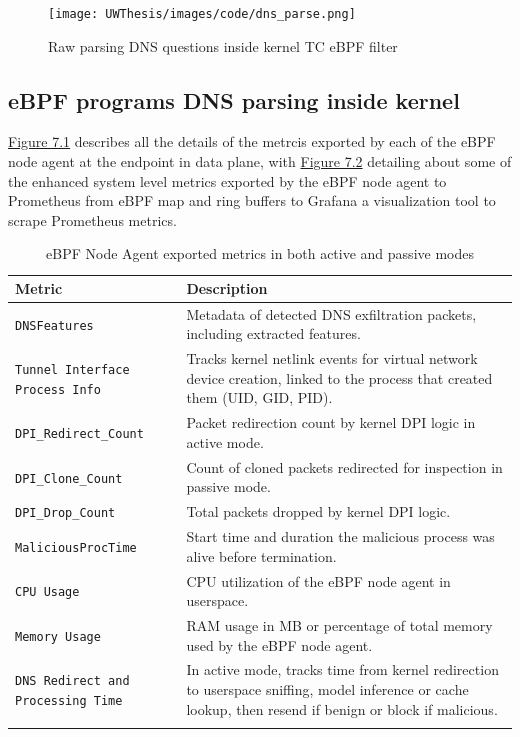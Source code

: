 \documentclass [11pt, proquest] {uwthesis}[2020/02/24]
\begin{document}
\begin{figure}[H]
    \centering
    \texttt{[image: UWThesis/images/code/dns\_parse.png]}
    \caption{Raw parsing DNS questions inside kernel TC eBPF filter}
    \label{fig:c2}
\end{figure}


\subsection{eBPF programs DNS parsing inside kernel}
\hyperref[sec:dp_ebpf_node_metrics]{Figure 7.1} describes all the details of the metrcis exported by each of  the eBPF node agent at the endpoint in data plane, with \hyperref[fig:dns-exfil-packet-metrics]{Figure 7.2} detailing about some of the enhanced system level metrics exported by the eBPF node agent to Prometheus from eBPF map and ring buffers to Grafana a visualization tool to scrape Prometheus metrics.

\begin{longtable}{|p{4cm}|p{10cm}|}
\hline
\textbf{Metric} & \textbf{Description} \\
\hline
\texttt{DNSFeatures} & Metadata of detected DNS exfiltration packets, including extracted features. \\
\hline
\texttt{Tunnel Interface Process Info} & Tracks kernel netlink events for virtual network device creation, linked to the process that created them (UID, GID, PID). \\
\hline
\texttt{DPI\_Redirect\_Count} & Packet redirection count by kernel DPI logic in active mode. \\
\hline
\texttt{DPI\_Clone\_Count} & Count of cloned packets redirected for inspection in passive mode. \\
\hline
\texttt{DPI\_Drop\_Count} & Total packets dropped by kernel DPI logic. \\
\hline
\texttt{MaliciousProcTime} & Start time and duration the malicious process was alive before termination. \\
\hline
\texttt{CPU Usage} & CPU utilization of the eBPF node agent in userspace. \\
\hline
\texttt{Memory Usage} & RAM usage in MB or percentage of total memory used by the eBPF node agent. \\
\hline
\texttt{DNS Redirect and Processing Time} & In active mode, tracks time from kernel redirection to userspace sniffing, model inference or cache lookup, then resend if benign or block if malicious. \\
\hline
\caption{eBPF Node Agent exported metrics in both active and passive modes}
\label{sec:dp_ebpf_node_metrics}
\end{longtable}
\end{document}
